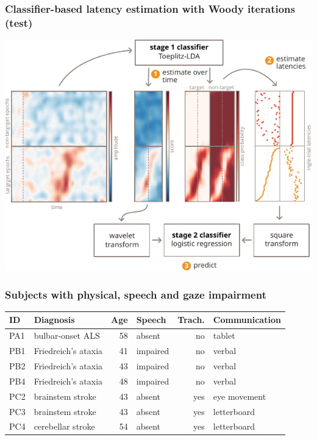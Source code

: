 \documentclass{kul-ulille-beamer}
\begin{document}
\begin{frame}[noframenumbering]
  \frametitle{Classifier-based latency estimation with Woody iterations (test)}
  \centering
  \includegraphics[width=.6\textwidth]{figures/covert/figure2.pdf}
\end{frame}

\begin{frame}[noframenumbering]
  \frametitle{Subjects with physical, speech and gaze impairment}

  \begin{tabular}{@{}l|lrlrl@{}}
      \textbf{ID}  & \textbf{Diagnosis} & \textbf{Age} &
      \textbf{Speech} & \textbf{Trach.} & \textbf{Communication} \\ \hline
      PA1 & bulbar-onset ALS & 58  & absent  & no          & tablet                 \\
      PB1 & Friedreich's ataxia & 41  & impaired & no          & verbal                 \\
      PB2 & Friedreich's ataxia & 43  & impaired & no          & verbal                 \\
      PB4 & Friedreich's ataxia & 48  & impaired & no          & verbal                 \\
      PC2 & brainstem stroke & 43  & absent  & yes         &  eye movement \\
      PC3 & brainstem stroke & 43  & absent  & yes         & letterboard            \\
      PC4 & cerebellar stroke & 54  & absent  & yes         & letterboard \\
  \end{tabular}

\end{frame}
\end{document}
